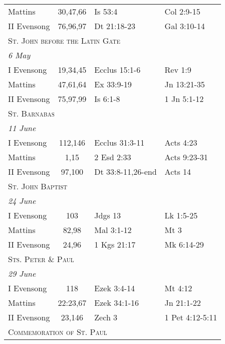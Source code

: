 \begin{longtable}{l c l l}
\hspace{1em} Mattins&30,47,66&Is 53:4&Col 2:9-15\\
\hspace{1em} II Evensong&76,96,97&Dt 21:18-23&Gal 3:10-14\\
%
\multicolumn{4}{l}{\textsc{St. John before the Latin Gate}}\\
\multicolumn{4}{l}{\textit{6 May}}\\
\hspace{1em} I Evensong&19,34,45&Ecclus 15:1-6&Rev 1:9\\
\hspace{1em} Mattins&47,61,64&Ex 33:9-19&Jn 13:21-35\\
\hspace{1em} II Evensong&75,97,99&Is 6:1-8&1 Jn 5:1-12\\
%
\multicolumn{4}{l}{\textsc{St. Barnabas}}\\
\multicolumn{4}{l}{\textit{11 June}}\\
\hspace{1em} I Evensong&112,146&Ecclus 31:3-11&Acts 4:23\\
\hspace{1em} Mattins&1,15&2 Esd 2:33&Acts 9:23-31\\
\hspace{1em} II Evensong&97,100&Dt 33:8-11,26-end&Acts 14\\
\multicolumn{4}{l}{\textsc{St. John Baptist}}\\
\multicolumn{4}{l}{\textit{24 June}}\\
\hspace{1em} I Evensong&103&Jdgs 13&Lk 1:5-25\\
\hspace{1em} Mattins&82,98&Mal 3:1-12&Mt 3\\
\hspace{1em} II Evensong&24,96&1 Kgs 21:17&Mk 6:14-29\\
\multicolumn{4}{l}{\textsc{Sts. Peter \& Paul}}\\
\multicolumn{4}{l}{\textit{29 June}}\\
\hspace{1em} I Evensong&118&Ezek 3:4-14&Mt 4:12\\
\hspace{1em} Mattins&22:23,67&Ezek 34:1-16&Jn 21:1-22\\
\hspace{1em} II Evensong&23,146&Zech 3&1 Pet 4:12-5:11\\
%
\multicolumn{4}{l}{\textsc{Commemoration of St. Paul}}\\

\end{longtable}
